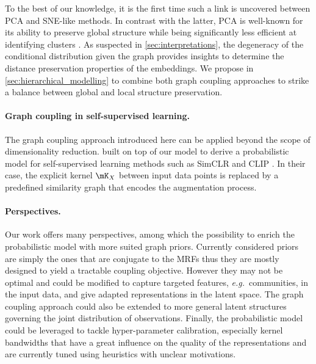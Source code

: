 To the best of our knowledge, it is the first time such a link is uncovered between PCA and SNE-like methods. In contrast with the latter, PCA is well-known for its ability to preserve global structure while being significantly less efficient at identifying clusters \citep{anowar2021conceptual}. As suspected in \cref{sec:interpretations}, the degeneracy of the conditional distribution given the graph provides insights to determine the distance preservation properties of the embeddings. We propose in \cref{sec:hierarchical_modelling} to combine both graph coupling approaches to strike a balance between global and local structure preservation.


\paragraph{Graph coupling in self-supervised learning.}
The graph coupling approach introduced here can be applied beyond the scope of dimensionality reduction. \citet{tan2023contrastive} built on top of our model to derive a probabilistic model for self-supervised learning methods such as SimCLR \citep{chen2020simple} and CLIP \citep{radford2021learning}. In their case, the explicit kernel $\mK_{X}$ between input data points is replaced by a predefined similarity graph that encodes the augmentation process.

\paragraph{Perspectives.}
Our work offers many perspectives, among which the possibility to enrich the probabilistic model with more suited graph priors. Currently considered priors are simply the ones that are conjugate to the MRFs thus they are mostly designed to yield a tractable coupling objective. However they may not be optimal and could be modified to capture targeted features, \textit{e.g.}\ communities, in the input data, and give adapted representations in the latent space. The graph coupling approach could also be extended to more general latent structures governing the joint distribution of observations.
Finally, the probabilistic model could be leveraged to tackle hyper-parameter calibration, especially kernel bandwidths that have a great influence on the quality of the representations and are currently tuned using heuristics with unclear motivations.


